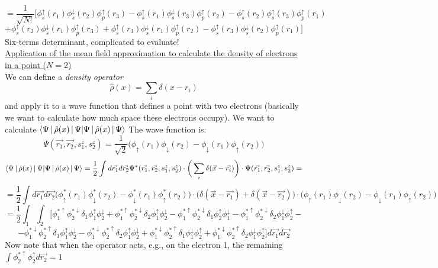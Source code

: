 \[
=\frac{1}{\sqrt{N!}}\big[
\phi_s^\uparrow(r_1)\phi_s^\downarrow(r_2)\phi_p^\uparrow(r_3)
-\phi_s^\uparrow(r_1)\phi_s^\downarrow(r_3)\phi_p^\uparrow(r_2)
-\phi_s^\uparrow(r_2)\phi_s^\uparrow(r_3)\phi_p^\uparrow(r_1)\]
\[+\phi_s^\uparrow(r_2)\phi_s^\downarrow(r_1)\phi_p^\uparrow(r_3)
+\phi_s^\uparrow(r_3)\phi_s^\downarrow(r_1)\phi_p^\uparrow(r_2)
-\phi_s^\uparrow(r_3)\phi_s^\downarrow(r_2)\phi_p^\uparrow(r_1)
\big]
\]
Six-terms determinant, complicated to evaluate!\\
\newline
\underline{Application of the mean field approximation to calculate the density of electrons in a point ($N=2$)}\\
\newline
We can define a \textit{density operator}
\[
\hat{\rho}(x)=\sum_i\delta(x-r_i)
\]
and apply it to a wave function that defines a point with two electrons (basically we want to calculate how much space these electrons occupy). We want to calculate $\braket{\Psi\,|\,\hat{\rho}(x)\,|\,\Psi}$
The wave function is:
\[
\Psi(\vec{r_1},\vec{r_2},s_1^z,s_2^z)=\frac{1}{\sqrt{2}}\big(\phi_\uparrow(r_1)\phi_\downarrow(r_2)-\phi_\downarrow(r_1)\phi_\uparrow(r_2)\big)
\]
\[
\braket{\Psi\,|\,\hat{\rho}(x)\,|\,\Psi}=\frac{1}{2}\int d\vec{r_1}d\vec{r_2} \Psi^*(\vec{r_1},\vec{r_2},s_1^z,s_2^z)\cdot\bigg(\sum_i \delta(\vec{x}-\vec{r_i})\bigg)\cdot\Psi(\vec{r_1},\vec{r_2},s_1^z,s_2^z)=
\]
\[
=\frac{1}{2}\int d\vec{r_1}d\vec{r_2}\big(\phi^*_\uparrow(r_1)\phi^*_\downarrow(r_2)-\phi^*_\downarrow(r_1)\phi^*_\uparrow(r_2)\big)\cdot\big(\delta(\vec{x}-\vec{r_1})+\delta(\vec{x}-\vec{r_2})\big)\cdot\big(\phi_\uparrow(r_1)\phi_\downarrow(r_2)-\phi_\downarrow(r_1)\phi_\uparrow(r_2)\big)
\]
\[
=\frac{1}{2}\int_1\int_2\bigg[
\phi_1^{*\uparrow}\phi_2^{*\downarrow}\delta_1\phi_1^\uparrow\phi_2^\downarrow
+\phi_1^{*\uparrow}\phi_2^{*\downarrow}\delta_2\phi_1^\uparrow\phi_2^\downarrow
-\phi_1^{*\uparrow}\phi_2^{*\downarrow}\delta_1\phi_2^\uparrow\phi_1^\downarrow
-\phi_1^{*\uparrow}\phi_2^{*\downarrow}\delta_2\phi_1^\downarrow\phi_2^\uparrow -\]
\[
-\phi_1^{*\downarrow}\phi_2^{*\uparrow}\delta_1\phi_1^\uparrow\phi_2^\downarrow
-\phi_1^{*\downarrow}\phi_2^{*\uparrow}\delta_2\phi_1^\uparrow\phi_2^\downarrow
+\phi_1^{*\downarrow}\phi_2^{*\uparrow}\delta_1\phi_1^\downarrow\phi_2^\uparrow
+\phi_1^{*\downarrow}\phi_2^{*\uparrow}\delta_2\phi_1^\downarrow\phi_2^\uparrow
\bigg]d\vec{r_1}d\vec{r_2}
\]
Now note that when the operator acts, e.g., on the electron 1, the remaining $\int \phi_2^{*\uparrow}\phi_2^\uparrow d\vec{r_2}=1$
